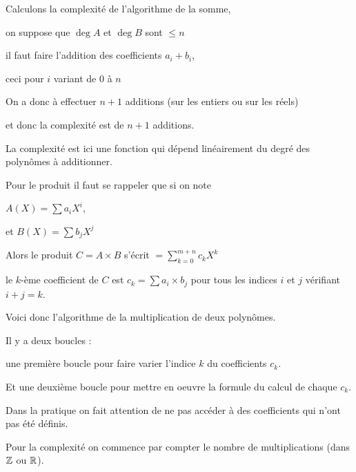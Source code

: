 \change

 Calculons la complexité de l'algorithme de la somme,
 
 \change
 
 on suppose que $\deg A$ et $\deg B$ sont $ \le n$ 
 
\change

 il faut faire l'addition des coefficients $a_i+b_i$,
 
\change

 ceci  pour $i$ variant de $0$ à $n$ 
 
 
\change

On a donc à effectuer $n+1$ additions (sur les entiers ou sur les réels)

et donc la complexité est de $n+1$ additions.

La complexité est ici une fonction qui dépend linéairement du degré des polynômes à additionner.


  

\diapo

Pour le produit il faut se rappeler que si on note 

$A(X) = \sum a_i X^i$,

et $B(X) = \sum b_j X^j$ 

\change

Alors le produit $C = A \times B$ s'écrit $= \sum_{k=0}^{m+n} c_k X^k$

\change

 le $k$-ème coefficient de $C$ est $c_k = \sum a_i \times b_j$ pour tous les indices $i$ et $j$ 
 vérifiant $i+j=k$.
 
\change

Voici donc l'algorithme de la multiplication de deux polynômes.


Il y a deux boucles :

une première boucle pour faire varier l'indice $k$ du coefficients $c_k$.

Et une deuxième boucle pour mettre en oeuvre la formule du calcul de chaque $c_k$.


Dans la pratique on fait attention de ne pas accéder à des coefficients qui n'ont pas été définis.



\diapo

\change

 Pour la complexité on commence par compter le nombre de multiplications (dans $\mathbb{Z}$ ou $\mathbb{R}$).
 
